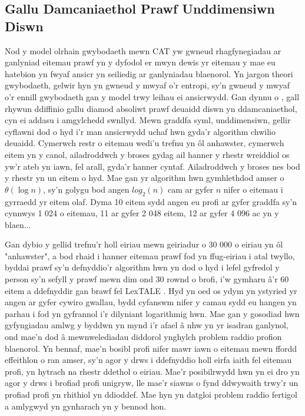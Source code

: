 \subsection{Gallu Damcaniaethol Prawf Unddimensiwn Diswn}
Nod y model olrhain gwybodaeth mewn CAT yw gwneud rhagfynegiadau ar ganlyniad eitemau prawf yn y dyfodol er mwyn dewis yr eitemau y mae eu hatebion yn fwyaf ansicr yn seiliedig ar ganlyniadau blaenorol. Yn jargon theori gwybodaeth, gelwir hyn yn gwneud y mwyaf o'r entropi, sy'n gwneud y mwyaf o'r ennill gwybodaeth gan y model trwy leihau ei ansicrwydd. Gan dynnu o \textcite{shannon_mathematical_1948}, gall rhywun ddiffinio gallu diamod absoliwt prawf deuaidd diswn yn ddamcaniaethol, cyn ei addasu i amgylchedd swnllyd. Mewn graddfa syml, unddimensiwn, gellir cyflawni dod o hyd i'r man ansicrwydd uchaf hwn gyda'r algorithm chwilio deuaidd. Cymerwch restr o eitemau wedi'u trefnu yn ôl anhawster, cymerwch eitem yn y canol, ailadroddwch y broses gydag ail hanner y rhestr wreiddiol os yw'r ateb yn iawn, fel arall, gyda'r hanner cyntaf. Ailadroddwch y broses nes bod y rhestr yn un eitem o hyd. Mae gan yr algorithm hwn gymhlethdod amser o $\theta(\log{n})$, sy'n golygu bod angen $log_2(n)$ cam ar gyfer $n$ nifer o eitemau i gyrraedd yr eitem olaf. Dyma 10 eitem sydd angen eu profi ar gyfer graddfa sy'n cynnwys 1 024 o eitemau, 11 ar gyfer 2 048 eitem, 12 ar gyfer 4 096 ac yn y blaen...

Gan dybio y gellid trefnu'r holl eiriau mewn geiriadur o 30 000 o eiriau yn ôl "anhawster", a bod rhaid i hanner eitemau prawf fod yn ffug-eiriau i atal twyllo, byddai prawf sy'n defnyddio'r algorithm hwn yn dod o hyd i lefel gyfredol y person sy'n sefyll y prawf mewn dim ond 30 rownd o brofi, i'w gymharu â'r 60 eitem a ddefnyddir gan brawf fel LexTALE \parencite{lemhofer_introducing_2012}. Hyd yn oed os ydym yn ystyried yr angen ar gyfer cywiro gwallau, bydd cyfanswm nifer y camau sydd eu hangen yn parhau i fod yn gyfrannol i'r dilyniant logarithmig hwn. Mae gan y gosodiad hwn gyfyngiadau amlwg y byddwn yn mynd i'r afael â nhw yn yr isadran ganlynol, ond mae'n dod â mewnwelediadau diddorol ynghylch problem raddio profion blaenorol. Yn bennaf, mae'n bosibl profi nifer mawr iawn o eitemau mewn ffordd effeithlon o ran amser, sy'n agor y drws i ddefnyddio holl eirfa iaith fel eitemau profi, yn hytrach na rhestr ddethol o eiriau. Mae'r posibilrwydd hwn yn ei dro yn agor y drws i brofiad profi unigryw, lle mae'r siawns o fynd ddwywaith trwy'r un profiad profi yn rhithiol yn ddioddef. Mae hyn yn datgloi problem raddio fertigol a amlygwyd yn gynharach yn y bennod hon.

